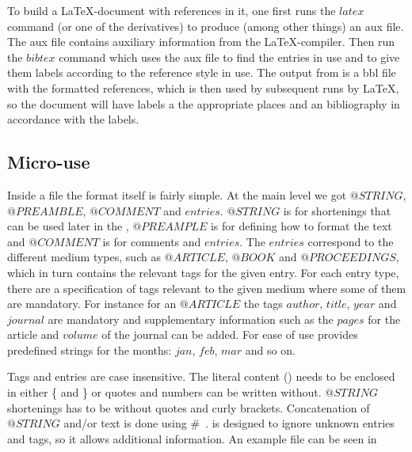 To build a {\LaTeX}-document with {\bibtex} references in it, one
first runs the $latex$ command (or one of the derivatives) to produce
(among other things) an aux file.  The aux file contains auxiliary
information from the {\LaTeX}-compiler.  Then run the $bibtex$ command
which uses the aux file to find the entries in use and to give them
labels according to the reference style in use.  The output from
{\bibtex} is a bbl file with the formatted references, which is then
used by subsequent runs by {\LaTeX}, so the document will have labels
a the appropriate places and an bibliography in accordance with the
labels.


\subsection{Micro-use}

Inside a {\bibtex} file the format itself is fairly simple. At the
main level we got $@STRING$, $@PREAMBLE$, $@COMMENT$ and $entries$.
$@STRING$ is for shortenings that can be used later in the {\bibtex},
$@PREAMPLE$ is for defining how to format the text and $@COMMENT$ is
for comments and $entries$.  The $entries$ correspond to the different
medium types, such as $@ARTICLE$, $@BOOK$ and $@PROCEEDINGS$, which in
turn contains the relevant tags for the given entry.  For each entry
type, there are a specification of tags relevant to the given medium
where some of them are mandatory. For instance for an $@ARTICLE$ the
tags $author$, $title$, $year$ and $journal$ are mandatory and
supplementary information such as the $pages$ for the article and
$volume$ of the journal can be added.  For ease of use {\bibtex}
provides predefined strings for the months: $jan$, $feb$, $mar$ and so
on.

Tags and entries are case insensitive. The literal content
() needs to be enclosed in either \{ and \} or quotes and
numbers can be written without.  $@STRING$ shortenings has to be
without quotes and curly brackets.  Concatenation of $@STRING$ and/or
text is done using \#~\cite{bibtex_resource}.  {\bibtex} is designed
to ignore unknown entries and tags, so it allows additional
information.  An example {\bibtex} file can be seen in

